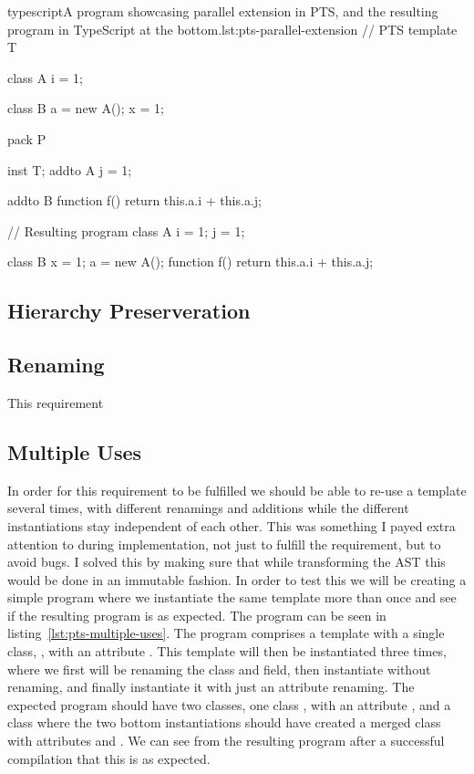 \begin{code}{typescript}{A program showcasing parallel extension in PTS, and the resulting program in TypeScript at the bottom.}{lst:pts-parallel-extension}
    // PTS
    template T {
        class A {
            i = 1;
        }

        class B {
            a = new A();
            x = 1;
        }
    }

    pack P {
        inst T;
        addto A {
            j = 1;
        }

        addto B {
            function f() {
                return this.a.i + this.a.j;
            }
        }
    }

    // Resulting program
    class A {
        i = 1;
        j = 1;
    }

    class B {
        x = 1;
        a = new A();
        function f() {
            return this.a.i + this.a.j;
        }
    }
\end{code}

\subsection{Hierarchy Preserveration}

\subsection{Renaming}

This requirement

\subsection{Multiple Uses}

In order for this requirement to be fulfilled we should be able to re-use a template several times, with different renamings and additions while the different instantiations stay independent of each other.
This was something I payed extra attention to during implementation, not just to fulfill the requirement, but to avoid bugs.
I solved this by making sure that while transforming the AST this would be done in an immutable fashion.
In order to test this we will be creating a simple program where we instantiate the same template more than once and see if the resulting program is as expected.
The program can be seen in listing~\vref{lst:pts-multiple-uses}.
The program comprises a template  with a single class, , with an attribute .
This template will then be instantiated three times, where we first will be renaming the class and field, then instantiate without renaming, and finally instantiate it with just an attribute renaming.
The expected program should have two classes, one class , with an attribute , and a class  where the two bottom instantiations should have created a merged class with attributes  and .
We can see from the resulting program after a successful compilation that this is as expected.

